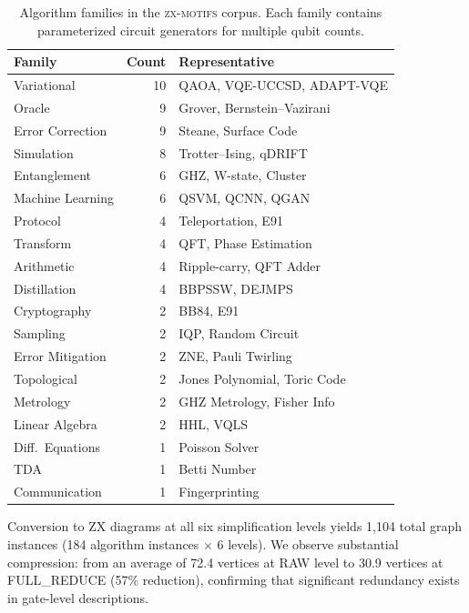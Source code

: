 \documentclass[twocolumn,prl,amsmath,amssymb,superscriptaddress]{revtex4-2}
\newcommand{\zxmotifs}{\textsc{zx-motifs}}
\begin{document}
\begin{table}[h]
\caption{Algorithm families in the \zxmotifs{} corpus. Each family contains parameterized circuit generators for multiple qubit counts.}
\label{tab:families}
\begin{ruledtabular}
\begin{tabular}{lrl}
\textbf{Family} & \textbf{Count} & \textbf{Representative} \\
\midrule
Variational & 10 & QAOA, VQE-UCCSD, ADAPT-VQE \\
Oracle & 9 & Grover, Bernstein--Vazirani \\
Error Correction & 9 & Steane, Surface Code \\
Simulation & 8 & Trotter--Ising, qDRIFT \\
Entanglement & 6 & GHZ, W-state, Cluster \\
Machine Learning & 6 & QSVM, QCNN, QGAN \\
Protocol & 4 & Teleportation, E91 \\
Transform & 4 & QFT, Phase Estimation \\
Arithmetic & 4 & Ripple-carry, QFT Adder \\
Distillation & 4 & BBPSSW, DEJMPS \\
Cryptography & 2 & BB84, E91 \\
Sampling & 2 & IQP, Random Circuit \\
Error Mitigation & 2 & ZNE, Pauli Twirling \\
Topological & 2 & Jones Polynomial, Toric Code \\
Metrology & 2 & GHZ Metrology, Fisher Info \\
Linear Algebra & 2 & HHL, VQLS \\
Diff.\ Equations & 1 & Poisson Solver \\
TDA & 1 & Betti Number \\
Communication & 1 & Fingerprinting \\
\end{tabular}
\end{ruledtabular}
\end{table}

Conversion to ZX diagrams at all six simplification levels yields 1,104 total graph instances (184 algorithm instances $\times$ 6 levels).
We observe substantial compression: from an average of 72.4 vertices at RAW level to 30.9 vertices at FULL\_REDUCE (57\% reduction), confirming that significant redundancy exists in gate-level descriptions.

\end{document}
